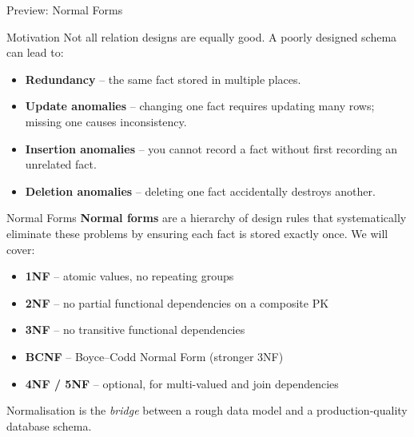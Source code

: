 \begin{frame}{Preview: Normal Forms}
  \begin{block}{Motivation}
    Not all relation designs are equally good.  A poorly designed schema
    can lead to:
    \begin{itemize}
      \item \textbf{Redundancy} -- the same fact stored in multiple places.
      \item \textbf{Update anomalies} -- changing one fact requires updating
            many rows; missing one causes inconsistency.
      \item \textbf{Insertion anomalies} -- you cannot record a fact without
            first recording an unrelated fact.
      \item \textbf{Deletion anomalies} -- deleting one fact accidentally
            destroys another.
    \end{itemize}
  \end{block}

  \begin{block}{Normal Forms}
    \textbf{Normal forms} are a hierarchy of design rules that systematically
    eliminate these problems by ensuring each fact is stored exactly once.
    We will cover:
    \begin{itemize}
      \item \textbf{1NF} -- atomic values, no repeating groups
      \item \textbf{2NF} -- no partial functional dependencies on a composite PK
      \item \textbf{3NF} -- no transitive functional dependencies
      \item \textbf{BCNF} -- Boyce--Codd Normal Form (stronger 3NF)
      \item \textbf{4NF / 5NF} -- optional, for multi-valued and join dependencies
    \end{itemize}
  \end{block}

  Normalisation is the \emph{bridge} between a rough data model and a
  production-quality database schema.
\end{frame}
